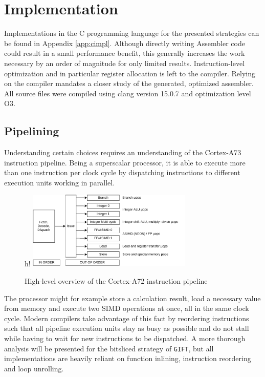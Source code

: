 \chapter{Implementation}

Implementations in the C programming language for the presented strategies can
be found in Appendix \ref{app:cimpl}. Although directly writing Assembler code
could result in a small performance benefit, this generally increases the work
necessary by an order of magnitude for only limited results. Instruction-level
optimization and in particular register allocation is left to the compiler.
Relying on the compiler mandates a closer study of the generated, optimized
assembler. All source files were compiled using clang version 15.0.7 and
optimization level O3.

\section{Pipelining}

Understanding certain choices requires an understanding of the Cortex-A73
instruction pipeline\cite{a72opt:2015}. Being a superscalar processor, it is
able to execute more than one instruction per clock cycle by dispatching
instructions to different execution units working in parallel.

\begin{figure}{h!}
    \centering
    \includegraphics[width=0.7\textwidth]{Figures/a72pipeline.pdf}
    \caption{High-level overview of the Cortex-A72 instruction pipeline}
\end{figure}

The processor might for example store a calculation result, load a necessary
value from memory and execute two SIMD operations at once, all in the same
clock cycle. Modern compilers take advantage of this fact by reordering
instructions such that all pipeline execution units stay as busy as possible
and do not stall while having to wait for new instructions to be dispatched. A
more thorough analysis will be presented for the bitsliced strategy of
\texttt{GIFT}, but all implementations are heavily reliant on function
inlining, instruction reordering and loop unrolling.

